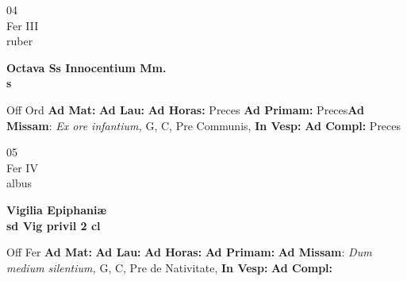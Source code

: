 \documentclass[10pt, openany]{book}
\begin{document}
    \begin{center}
        \begin{minipage}{3.5in}
            \vspace{2em}
            \begin{minipage}{0.5in}
                {\Huge 04} \\
                {\normalsize Fer III} \\
                {\normalsize ruber}
            \end{minipage}
            \begin{minipage}{3.0in}
                \textbf{ \large Octava Ss Innocentium Mm. \\
                \textnormal{\normalsize s}} \\ 
            \end{minipage}
            \begin{justify}Off Ord
                \textbf{Ad Mat: }
                \textbf{Ad Lau: }
                \textbf{Ad Horas: }Preces
                \textbf{Ad Primam: }Preces\textbf{Ad Missam}: \textit{Ex ore infantium,} G, C, Pre Communis,  
                \textbf{In Vesp: }
                \textbf{Ad Compl: }Preces
            \end{justify}
        \end{minipage}
    \end{center}

    \begin{center}
        \begin{minipage}{3.5in}
            \vspace{2em}
            \begin{minipage}{0.5in}
                {\Huge 05} \\
                {\normalsize Fer IV} \\
                {\normalsize albus}
            \end{minipage}
            \begin{minipage}{3.0in}
                \textbf{ \large Vigilia Epiphaniæ \\
                \textnormal{\normalsize sd Vig privil 2 cl}} \\ 
            \end{minipage}
            \begin{justify}Off Fer
                \textbf{Ad Mat: }
                \textbf{Ad Lau: }
                \textbf{Ad Horas: }
                \textbf{Ad Primam: }\textbf{Ad Missam}: \textit{Dum medium silentium,} G, C, Pre de Nativitate,  
                \textbf{In Vesp: }
                \textbf{Ad Compl: }
            \end{justify}
        \end{minipage}
    \end{center}
\end{document}
